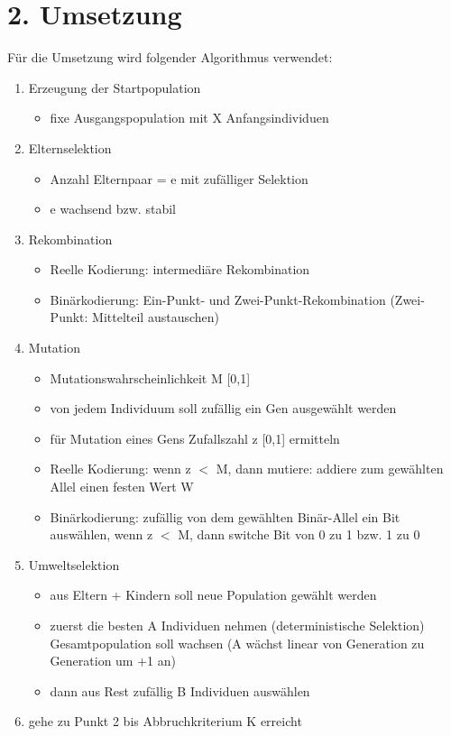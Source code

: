 \documentclass[12pt,
    a4paper,
    headinclude,
    footinclude]{scrreprt}
\begin{document}
\section*{2. Umsetzung}


Für die Umsetzung wird folgender Algorithmus verwendet:

\begin{enumerate}
	\item Erzeugung der Startpopulation 
	\begin{itemize}
		\item fixe Ausgangspopulation mit X Anfangsindividuen
	\end{itemize}
	\item Elternselektion
		\begin{itemize}
		\item Anzahl Elternpaar = e mit zufälliger Selektion
		\item e wachsend bzw. stabil
	\end{itemize}
	\item Rekombination
		\begin{itemize}
		\item Reelle Kodierung: intermediäre Rekombination
		\item Binärkodierung: Ein-Punkt- und Zwei-Punkt-Rekombination (Zwei-Punkt: Mittelteil austauschen)
	\end{itemize}
	\item Mutation
		\begin{itemize}
		\item Mutationswahrscheinlichkeit M [0,1]
		\item von jedem Individuum soll zufällig ein Gen ausgewählt werden
		\item für Mutation eines Gens Zufallszahl z [0,1] ermitteln
		\item Reelle Kodierung: wenn z $<$ M, dann mutiere: addiere zum gewählten Allel einen festen Wert W
		\item Binärkodierung: zufällig von dem gewählten Binär-Allel ein Bit auswählen, wenn z $<$ M, dann switche Bit von 0 zu 1 bzw. 1 zu 0
	\end{itemize} 
	\item Umweltselektion
		\begin{itemize}
		\item aus Eltern + Kindern soll neue Population gewählt werden 
		\item zuerst die besten A Individuen nehmen (deterministische Selektion) Gesamtpopulation soll wachsen (A wächst linear von Generation zu Generation um +1 an)
		\item dann aus Rest zufällig B Individuen auswählen
	\end{itemize}
	\item gehe zu Punkt 2 bis Abbruchkriterium K erreicht
\end{enumerate}
\end{document}
